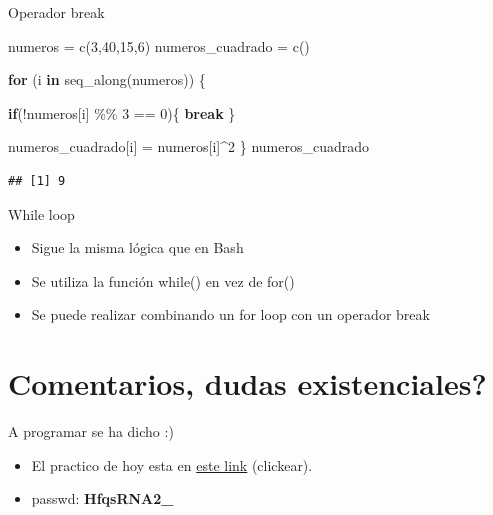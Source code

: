 \documentclass[
  ignorenonframetext,
]{beamer}
\newenvironment{Shaded}{\begin{snugshade}}{\end{snugshade}}
\newcommand{\ControlFlowTok}[1]{\textcolor[rgb]{0.13,0.29,0.53}{\textbf{#1}}}
\newcommand{\DecValTok}[1]{\textcolor[rgb]{0.00,0.00,0.81}{#1}}
\newcommand{\FunctionTok}[1]{\textcolor[rgb]{0.00,0.00,0.00}{#1}}
\newcommand{\NormalTok}[1]{#1}
\newcommand{\OtherTok}[1]{\textcolor[rgb]{0.56,0.35,0.01}{#1}}
\newcommand{\SpecialCharTok}[1]{\textcolor[rgb]{0.00,0.00,0.00}{#1}}
\providecommand{\tightlist}{%
  \setlength{\itemsep}{0pt}\setlength{\parskip}{0pt}}
\begin{document}
\begin{frame}[fragile]{Operador break}
\protect\hypertarget{operador-break}{}
\begin{Shaded}
\begin{Highlighting}[]
\NormalTok{numeros }\OtherTok{=} \FunctionTok{c}\NormalTok{(}\DecValTok{3}\NormalTok{,}\DecValTok{40}\NormalTok{,}\DecValTok{15}\NormalTok{,}\DecValTok{6}\NormalTok{)}
\NormalTok{numeros\_cuadrado }\OtherTok{=} \FunctionTok{c}\NormalTok{()}

\ControlFlowTok{for}\NormalTok{ (i }\ControlFlowTok{in} \FunctionTok{seq\_along}\NormalTok{(numeros)) \{}
  
  \ControlFlowTok{if}\NormalTok{(}\SpecialCharTok{!}\NormalTok{numeros[i] }\SpecialCharTok{\%\%} \DecValTok{3} \SpecialCharTok{==} \DecValTok{0}\NormalTok{)\{}
    \ControlFlowTok{break}
\NormalTok{  \}}
  
\NormalTok{  numeros\_cuadrado[i] }\OtherTok{=}\NormalTok{ numeros[i]}\SpecialCharTok{\^{}}\DecValTok{2}
\NormalTok{\}}
\NormalTok{numeros\_cuadrado}
\end{Highlighting}
\end{Shaded}

\begin{verbatim}
## [1] 9
\end{verbatim}
\end{frame}

\begin{frame}{While loop}
\protect\hypertarget{while-loop}{}
\begin{itemize}
\tightlist
\item
  Sigue la misma lógica que en Bash
\item
  Se utiliza la función while() en vez de for()
\item
  Se puede realizar combinando un for loop con un operador break
\end{itemize}
\end{frame}

\hypertarget{comentarios-dudas-existenciales}{%
\section{Comentarios, dudas
existenciales?}\label{comentarios-dudas-existenciales}}

\begin{frame}{A programar se ha dicho :)}
\protect\hypertarget{a-programar-se-ha-dicho}{}
\begin{itemize}
\tightlist
\item
  El practico de hoy esta en
  \href{http://www.higiene.edu.uy/ddbp/lbc/html/Practico9.html}{este
  link} (clickear).
\item
  passwd: \textbf{HfqsRNA2\_}
\end{itemize}
\end{frame}
\end{document}
